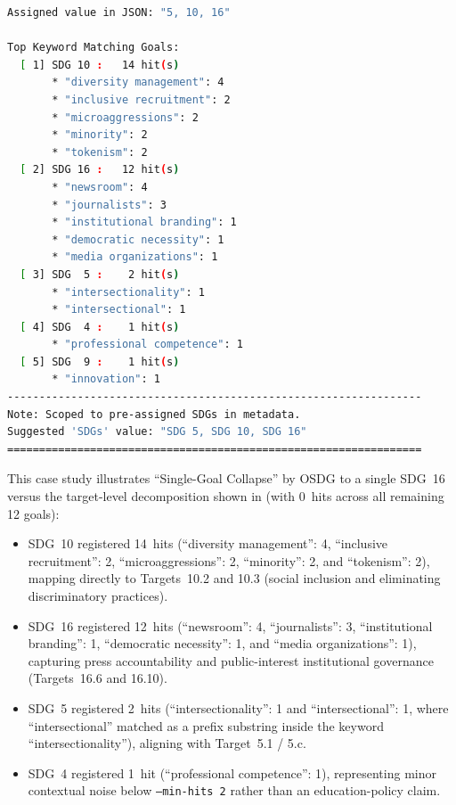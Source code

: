 \begin{casestudySection}
\begin{lstlisting}[language={bash}, basicstyle=\footnotesize, escapechar=|, breaklines=true,
    postbreak=\usebox{\lstbreakbox}, caption={Program's output}, label=lst:t_17547Output]
Assigned value in JSON: "5, 10, 16"

Top Keyword Matching Goals:
  [ 1] SDG 10 :   14 hit(s)
       * "diversity management": 4
       * "inclusive recruitment": 2
       * "microaggressions": 2
       * "minority": 2
       * "tokenism": 2
  [ 2] SDG 16 :   12 hit(s)
       * "newsroom": 4
       * "journalists": 3
       * "institutional branding": 1
       * "democratic necessity": 1
       * "media organizations": 1
  [ 3] SDG  5 :    2 hit(s)
       * "intersectionality": 1
       * "intersectional": 1
  [ 4] SDG  4 :    1 hit(s)
       * "professional competence": 1
  [ 5] SDG  9 :    1 hit(s)
       * "innovation": 1
-----------------------------------------------------------------
Note: Scoped to pre-assigned SDGs in metadata.
Suggested 'SDGs' value: "SDG 5, SDG 10, SDG 16"
=================================================================
\end{lstlisting}

This case study illustrates \enquote{Single-Goal Collapse} by OSDG to a single \gls{SDG}~16 versus the target-level decomposition shown in  (with \num{0}~hits across all remaining \num{12} goals):
\begin{itemize}
    \item \gls{SDG}~10 registered \num{14}~hits (\enquote{diversity management}: 4, \enquote{inclusive recruitment}: 2, \enquote{microaggressions}: 2, \enquote{minority}: 2, and \enquote{tokenism}: 2), mapping directly to Targets~10.2 and 10.3 (social inclusion and eliminating discriminatory practices).

    \item \gls{SDG}~16 registered \num{12}~hits (\enquote{newsroom}: 4, \enquote{journalists}: 3, \enquote{institutional branding}: 1, \enquote{democratic necessity}: 1, and \enquote{media organizations}: 1), capturing press accountability and public-interest institutional governance (Targets~16.6 and 16.10).

    \item \gls{SDG}~5 registered \num{2}~hits (\enquote{intersectionality}: 1 and \enquote{intersectional}: 1, where \enquote{intersectional} matched as a prefix substring inside the keyword \enquote{intersectionality}), aligning with Target~5.1 / 5.c.

    \item \gls{SDG}~4 registered \num{1}~hit (\enquote{professional competence}: 1), representing minor contextual noise below \texttt{--min-hits 2} rather than an education-policy claim.


\end{itemize}
\end{casestudySection}
